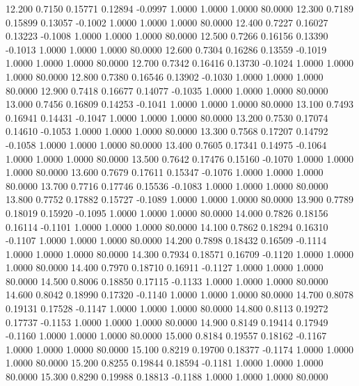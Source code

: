   12.200   0.7150   0.15771   0.12894  -0.0997   1.0000   1.0000   1.0000  80.0000
  12.300   0.7189   0.15899   0.13057  -0.1002   1.0000   1.0000   1.0000  80.0000
  12.400   0.7227   0.16027   0.13223  -0.1008   1.0000   1.0000   1.0000  80.0000
  12.500   0.7266   0.16156   0.13390  -0.1013   1.0000   1.0000   1.0000  80.0000
  12.600   0.7304   0.16286   0.13559  -0.1019   1.0000   1.0000   1.0000  80.0000
  12.700   0.7342   0.16416   0.13730  -0.1024   1.0000   1.0000   1.0000  80.0000
  12.800   0.7380   0.16546   0.13902  -0.1030   1.0000   1.0000   1.0000  80.0000
  12.900   0.7418   0.16677   0.14077  -0.1035   1.0000   1.0000   1.0000  80.0000
  13.000   0.7456   0.16809   0.14253  -0.1041   1.0000   1.0000   1.0000  80.0000
  13.100   0.7493   0.16941   0.14431  -0.1047   1.0000   1.0000   1.0000  80.0000
  13.200   0.7530   0.17074   0.14610  -0.1053   1.0000   1.0000   1.0000  80.0000
  13.300   0.7568   0.17207   0.14792  -0.1058   1.0000   1.0000   1.0000  80.0000
  13.400   0.7605   0.17341   0.14975  -0.1064   1.0000   1.0000   1.0000  80.0000
  13.500   0.7642   0.17476   0.15160  -0.1070   1.0000   1.0000   1.0000  80.0000
  13.600   0.7679   0.17611   0.15347  -0.1076   1.0000   1.0000   1.0000  80.0000
  13.700   0.7716   0.17746   0.15536  -0.1083   1.0000   1.0000   1.0000  80.0000
  13.800   0.7752   0.17882   0.15727  -0.1089   1.0000   1.0000   1.0000  80.0000
  13.900   0.7789   0.18019   0.15920  -0.1095   1.0000   1.0000   1.0000  80.0000
  14.000   0.7826   0.18156   0.16114  -0.1101   1.0000   1.0000   1.0000  80.0000
  14.100   0.7862   0.18294   0.16310  -0.1107   1.0000   1.0000   1.0000  80.0000
  14.200   0.7898   0.18432   0.16509  -0.1114   1.0000   1.0000   1.0000  80.0000
  14.300   0.7934   0.18571   0.16709  -0.1120   1.0000   1.0000   1.0000  80.0000
  14.400   0.7970   0.18710   0.16911  -0.1127   1.0000   1.0000   1.0000  80.0000
  14.500   0.8006   0.18850   0.17115  -0.1133   1.0000   1.0000   1.0000  80.0000
  14.600   0.8042   0.18990   0.17320  -0.1140   1.0000   1.0000   1.0000  80.0000
  14.700   0.8078   0.19131   0.17528  -0.1147   1.0000   1.0000   1.0000  80.0000
  14.800   0.8113   0.19272   0.17737  -0.1153   1.0000   1.0000   1.0000  80.0000
  14.900   0.8149   0.19414   0.17949  -0.1160   1.0000   1.0000   1.0000  80.0000
  15.000   0.8184   0.19557   0.18162  -0.1167   1.0000   1.0000   1.0000  80.0000
  15.100   0.8219   0.19700   0.18377  -0.1174   1.0000   1.0000   1.0000  80.0000
  15.200   0.8255   0.19844   0.18594  -0.1181   1.0000   1.0000   1.0000  80.0000
  15.300   0.8290   0.19988   0.18813  -0.1188   1.0000   1.0000   1.0000  80.0000
